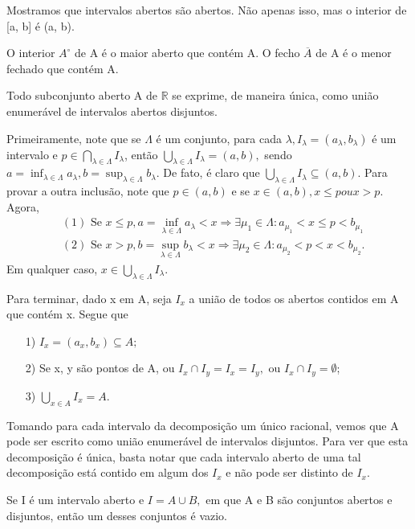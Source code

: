 \documentclass[analysis_notes.tex]{subfiles}
\begin{document}
\begin{example}
	Mostramos que intervalos abertos s\~ao abertos. N\~ao apenas isso, mas o interior de [a, b] \'e (a, b).
\end{example}
\begin{example}
	O interior $A^{\circ}$ de A \'e o maior aberto que cont\'em A. O fecho $\overline{A}$ de A \'e o menor fechado que cont\'em A.
\end{example}
\begin{theorem*}
	Todo subconjunto aberto A de $\mathbb{R}$ se exprime, de maneira \'unica, como uni\~ao enumer\'avel de intervalos abertos disjuntos.
\end{theorem*}
\begin{proof*}
	Primeiramente, note que se $\Lambda $ \'e um conjunto, para cada $\lambda, I_{\lambda }=(a_{\lambda }, b_{\lambda })$ \'e um intervalo
	e $p\in\bigcap_{\lambda \in\Lambda }^{}{I_{\lambda }}$, ent\~ao $\bigcup_{\lambda \in\Lambda }^{}{I_{\lambda }}=(a, b),$ sendo
	$a = \inf_{\lambda \in\Lambda }a_{\lambda }, b = \sup_{\lambda \in\Lambda }b_{\lambda }.$ De fato, \'e claro que $\bigcup_{\lambda \in\Lambda }^{}{I_{\lambda }}\subseteq{(a, b)}$.
	Para provar a outra inclus\~ao, note que $p\in(a, b)$ e se $x\in(a, b), x\leq p ou x > p.$ Agora,
	\begin{align*}
		 & (1) \text{ Se }  x\leq p, a = \inf_{\lambda \in\Lambda }a_{\lambda } < x \Rightarrow \exists \mu_{1}\in\Lambda: a_{\mu_{1}}<x\leq p < b_{\mu_{1}} \\
		 & (2) \text{ Se } x > p, b=\sup_{\lambda \in\Lambda }b_{\lambda } < x \Rightarrow \exists \mu_{2}\in\Lambda: a_{\mu_{2}} < p < x < b_{\mu_{2}}.
	\end{align*}
	Em qualquer caso,  $x\in \bigcup_{\lambda \in\Lambda }^{}{I_{\lambda }}.$

	Para terminar, dado x em A, seja $I_{x}$ a uni\~ao de todos os abertos contidos em A que cont\'em x. Segue que
	\begin{itemize}
		\item[1)] $I_{x} = (a_{x}, b_{x})\subseteq{A};$
		\item[2)] Se x, y s\~ao pontos de A, ou $I_{x}\cap I_{y}=I_{x} = I_{y},$ ou $I_{x}\cap I_{y} = \emptyset$;
		\item[3)] $\bigcup_{x\in A}^{}{I_{x}} = A.$
	\end{itemize}
	Tomando para cada intervalo da decomposi\c c\~ao um \'unico racional, vemos que A pode ser escrito como uni\~ao enumer\'avel de
	intervalos disjuntos. Para ver que esta decomposi\c c\~ao \'e \'unica, basta notar que cada intervalo aberto de uma tal decomposi\c c\~ao
	est\'a contido em algum dos $I_{x}$ e n\~ao pode ser distinto de $I_{x}.$ \qedsymbol
\end{proof*}
\begin{crl*}
	Se I \'e um intervalo aberto e $I = A\cup B,$ em que A e B s\~ao conjuntos abertos e disjuntos, ent\~ao um desses conjuntos \'e vazio.
\end{crl*}
\end{document}
